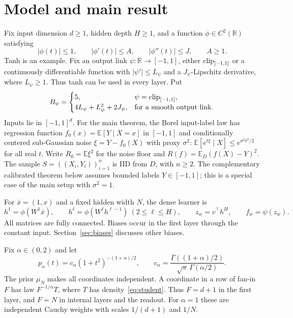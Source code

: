 \documentclass[11pt]{article}
\theoremstyle{remark}\newtheorem{remark}[theorem]{Remark}
\newcommand{\E}{\mathbb E}\newcommand{\R}{\mathbb R}\newcommand{\Pp}{\mathbb P}
\begin{document}
\section{Model and main result}
Fix input dimension $d\ge1$, hidden depth $H\ge1$, and a function $\phi\in C^2(\R)$ satisfying
\begin{equation}
 |\phi(t)|\le1,\qquad |\phi'(t)|\le A,\qquad
 |\phi''(t)|\le J,\qquad A\ge1.
 \label{eq:activation}
\end{equation}
Tanh is an example. Fix an output link $\psi:\R\to[-1,1]$, either $\operatorname{clip}_{[-1,1]}$ or a continuously differentiable function with $|\psi'|\le L_\psi$ and a $J_\psi$-Lipschitz derivative, where $L_\psi\ge1$. Thus tanh can be used in every layer. Put
\[
 B_\psi=\begin{cases}5,&\psi=\operatorname{clip}_{[-1,1]},\\
 4L_\psi+L_\psi^2+2J_\psi,&\text{for a smooth output link}.
 \end{cases}
\]
Inputs lie in $[-1,1]^d$. For the main theorem, the Borel input-label law has regression function $f_0(x)=\E[Y\mid X=x]$ in $[-1,1]$ and conditionally centered sub-Gaussian noise $\xi=Y-f_0(X)$ with proxy $\sigma^2$: $\E[e^{t\xi}\mid X]\le e^{\sigma^2t^2/2}$ for all real $t$. Write $R_0=\E\xi^2$ for the noise floor and $R(f)=\E_D(f(X)-Y)^2$. The sample $S=((X_i,Y_i))_{i=1}^n$ is IID from $D$, with $n\ge2$. The complementary calibrated theorem below assumes bounded labels $Y\in[-1,1]$; this is a special case of the main setup with $\sigma^2=1$.

For $\bar x=(1,x)$ and a fixed hidden width $N$, the dense learner is
\begin{equation}
 h^1=\phi(W^1\bar x),\qquad
 h^\ell=\phi(W^\ell h^{\ell-1})\ (2\le\ell\le H),\qquad
 z_w=v^\top h^H,\qquad f_w=\psi(z_w).
 \label{eq:network}
\end{equation}
All matrices are fully connected. Biases occur in the first layer through the constant input. Section~\ref{sec:biases} discusses other biases.

Fix $\alpha\in(0,2)$ and let
\begin{equation}
 p_\alpha(t)=c_\alpha(1+t^2)^{-(1+\alpha)/2},\qquad
 c_\alpha=\frac{\Gamma((1+\alpha)/2)}{\sqrt\pi\,\Gamma(\alpha/2)}.
 \label{eq:student}
\end{equation}
The prior $\mu_N$ makes all coordinates independent. A coordinate in a row of fan-in $F$ has law $F^{-1/\alpha}T$, where $T$ has density~\eqref{eq:student}. Thus $F=d+1$ in the first layer, and $F=N$ in internal layers and the readout. For $\alpha=1$ these are independent Cauchy weights with scales $1/(d+1)$ and $1/N$.
\end{document}
